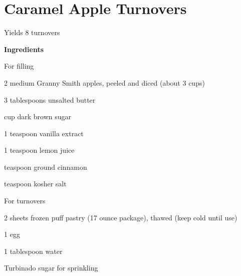 \documentclass[../book.tex]{subfiles}
\begin{document}

\section{Caramel Apple Turnovers}

{\sffamily Yields 8 turnovers}\vspace{1ex}

	\begin{minipage}[t]{0.35\textwidth}
		{\bfseries\large Ingredients}
    \begin{mydesc}
      \item[For filling]\hfill
        \begin{mying}
        \item 2 medium Granny Smith apples, peeled and diced (about 3 cups)
        \item 3 tablespoons unsalted butter
        \item {} cup dark brown sugar
        \item 1 teaspoon vanilla extract
        \item 1 teaspoon lemon juice
        \item {} teaspoon ground cinnamon
        \item {} teaspoon kosher salt
        \end{mying}
      \item[For turnovers]\hfill
        \begin{mying}
        \item 2 sheets frozen puff pastry (17 ounce package), thawed (keep cold until use)
        \item 1 egg
        \item 1 tablespoon water
        \item Turbinado sugar for sprinkling
        \end{mying}
      \end{mydesc}
      \vspace{1ex}
	\end{minipage}
\quad
\end{document}
